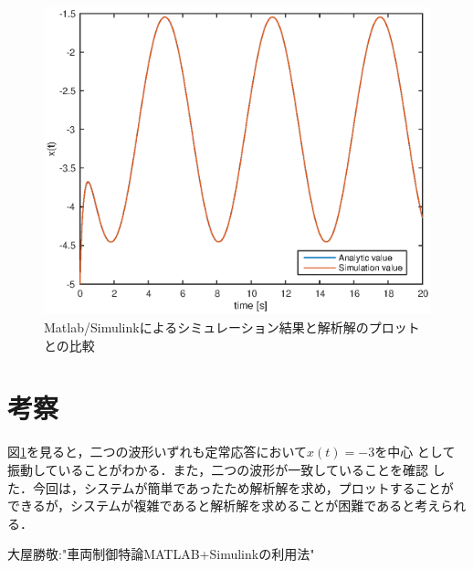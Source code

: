 \documentclass[a4paper,12pt]{jarticle}
\begin{document}
%
\begin{figure}[bp]
 \begin{center}
  \includegraphics[scale=.9]{fig/multi.eps}
 \end{center}
 \caption{Matlab/Simulinkによるシミュレーション結果と解析解のプロットとの比較}
 \label{fig:text2}
\end{figure}
%
\section{考察}
図\ref{fig:text2}を見ると，二つの波形いずれも定常応答において$x(t)=-3$を中心
として振動していることがわかる．また，二つの波形が一致していることを確認
した．今回は，システムが簡単であったため解析解を求め，プロットすることが
できるが，システムが複雑であると解析解を求めることが困難であると考えられ
る．
%
%
\begin{thebibliography}{99}

  大屋勝敬:"車両制御特論MATLAB+Simulinkの利用法"
\end{thebibliography}
\end{document}
